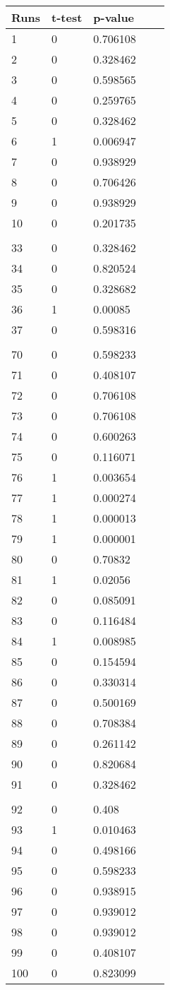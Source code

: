 
\begin{tabular}{lllll}

{\bf Runs} & {\bf t-test} & {\bf p-value}  \\ \hline

1 & 0 & 0.706108  \\
2 & 0 & 0.328462  \\
3 & 0 & 0.598565  \\
4 & 0 & 0.259765  \\
5 & 0 & 0.328462  \\
6 & 1 & 0.006947  \\
7 & 0 & 0.938929  \\
8 & 0 & 0.706426  \\
9 & 0 & 0.938929  \\
10 & 0 & 0.201735  \\
\\
33 & 0 & 0.328462  \\
34 & 0 & 0.820524  \\
35 & 0 & 0.328682  \\
36 & 1 & 0.00085  \\
37 & 0 & 0.598316  \\
\\
70 & 0 & 0.598233  \\
71 & 0 & 0.408107  \\
72 & 0 & 0.706108  \\
73 & 0 & 0.706108  \\
74 & 0 & 0.600263  \\
75 & 0 & 0.116071  \\
76 & 1 & 0.003654  \\
77 & 1 & 0.000274  \\
78 & 1 & 0.000013  \\
79 & 1 & 0.000001  \\
80 & 0 & 0.70832  \\
81 & 1 & 0.02056  \\
82 & 0 & 0.085091  \\
83 & 0 & 0.116484  \\
84 & 1 & 0.008985  \\
85 & 0 & 0.154594  \\
86 & 0 & 0.330314  \\
87 & 0 & 0.500169  \\
88 & 0 & 0.708384  \\
89 & 0 & 0.261142  \\
90 & 0 & 0.820684  \\
91 & 0 & 0.328462  \\
\\
92 & 0 & 0.408  \\
93 & 1 & 0.010463  \\
94 & 0 & 0.498166  \\
95 & 0 & 0.598233  \\
96 & 0 & 0.938915  \\
97 & 0 & 0.939012  \\
98 & 0 & 0.939012  \\
99 & 0 & 0.408107  \\
100 & 0 & 0.823099  \\
  
\hline
\end{tabular}
